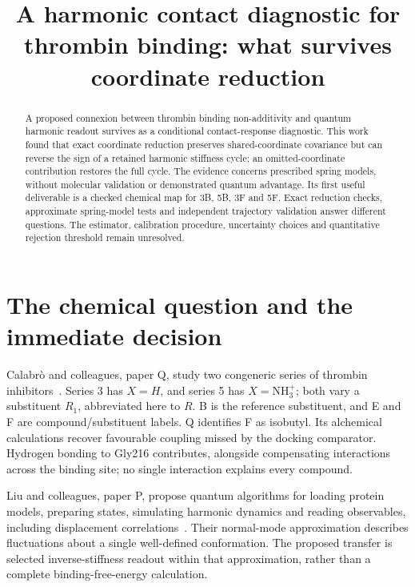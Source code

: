 \documentclass{article}
\title{A harmonic contact diagnostic for thrombin binding: what survives coordinate reduction}
\begin{document}
\maketitle

\begin{abstract}
A proposed connexion between thrombin binding non-additivity and quantum harmonic readout survives as a conditional contact-response diagnostic. This work found that exact coordinate reduction preserves shared-coordinate covariance but can reverse the sign of a retained harmonic stiffness cycle; an omitted-coordinate contribution restores the full cycle. The evidence concerns prescribed spring models, without molecular validation or demonstrated quantum advantage. Its first useful deliverable is a checked chemical map for 3B, 5B, 3F and 5F. Exact reduction checks, approximate spring-model tests and independent trajectory validation answer different questions. The estimator, calibration procedure, uncertainty choices and quantitative rejection threshold remain unresolved.
\end{abstract}

\section{The chemical question and the immediate decision}
Calabr\`o and colleagues, paper Q, study two congeneric series of thrombin inhibitors~\cite{Q}. Series 3 has \(X=H\), and series 5 has \(X=\mathrm{NH}_3^+\); both vary a substituent \(R_1\), abbreviated here to \(R\). B is the reference substituent, and E and F are compound/substituent labels. Q identifies F as isobutyl. Its alchemical calculations recover favourable coupling missed by the docking comparator. Hydrogen bonding to Gly216 contributes, alongside compensating interactions across the binding site; no single interaction explains every compound.

Liu and colleagues, paper P, propose quantum algorithms for loading protein models, preparing states, simulating harmonic dynamics and reading observables, including displacement correlations~\cite{P}. Their normal-mode approximation describes fluctuations about a single well-defined conformation. The proposed transfer is selected inverse-stiffness readout within that approximation, rather than a complete binding-free-energy calculation.
\end{document}
